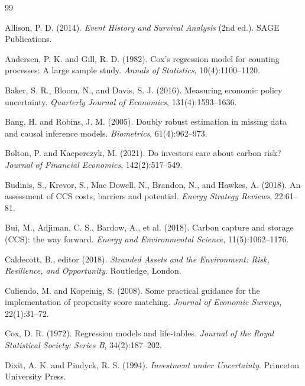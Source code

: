 \documentclass[review,authoryear,11pt]{elsarticle}
\begin{document}
\renewcommand{\bibname}{References}
\begin{thebibliography}{99}

Allison, P. D. (2014). \textit{Event History and Survival Analysis} (2nd ed.). SAGE Publications.

Andersen, P. K. and Gill, R. D. (1982). Cox's regression model for counting processes: A large sample study. \textit{Annals of Statistics}, 10(4):1100--1120.

Baker, S. R., Bloom, N., and Davis, S. J. (2016). Measuring economic policy uncertainty. \textit{Quarterly Journal of Economics}, 131(4):1593--1636.

Bang, H. and Robins, J. M. (2005). Doubly robust estimation in missing data and causal inference models. \textit{Biometrics}, 61(4):962--973.

Bolton, P. and Kacperczyk, M. (2021). Do investors care about carbon risk? \textit{Journal of Financial Economics}, 142(2):517--549.

Budinis, S., Krevor, S., Mac Dowell, N., Brandon, N., and Hawkes, A. (2018). An assessment of CCS costs, barriers and potential. \textit{Energy Strategy Reviews}, 22:61--81.

Bui, M., Adjiman, C. S., Bardow, A., et al. (2018). Carbon capture and storage (CCS): the way forward. \textit{Energy and Environmental Science}, 11(5):1062--1176.

Caldecott, B., editor (2018). \textit{Stranded Assets and the Environment: Risk, Resilience, and Opportunity}. Routledge, London.

Caliendo, M. and Kopeinig, S. (2008). Some practical guidance for the implementation of propensity score matching. \textit{Journal of Economic Surveys}, 22(1):31--72.

Cox, D. R. (1972). Regression models and life-tables. \textit{Journal of the Royal Statistical Society: Series B}, 34(2):187--202.

Dixit, A. K. and Pindyck, R. S. (1994). \textit{Investment under Uncertainty}. Princeton University Press.


\end{thebibliography}
\end{document}
